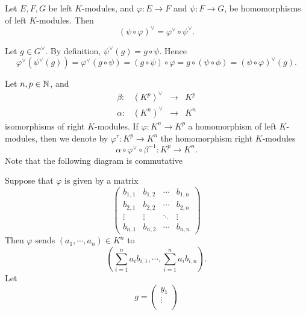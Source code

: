 \begin{propositionenv}
    Let $E,F,G$ be left $K$-modules, and $\varphi : E\rightarrow F$ and $\psi: F\rightarrow G$, be homomorphisms of left $K$-modules. Then 
    $$
    \left(\psi \circ \varphi\right)^\vee = \varphi^\vee \circ \psi^\vee.
    $$
\end{propositionenv}
\begin{proofenv}
    Let $g \in G^\vee$. By definition, $\psi^\vee(g) = g \circ \psi$. Hence
    $$
    \varphi^\vee \left(\psi^\vee (g)\right) = \varphi^\vee \left(g \circ \psi\right) = \left( g\circ \psi \right) \circ \varphi = g\circ \left(\psi \circ\phi\right) = \left(\psi \circ \varphi \right)^\vee (g).
    $$
\end{proofenv}
\begin{exampleenv}
    Let $n,p \in \NN$, and
    $$\begin{array}{rrcl}
        \beta : & \left(K^p\right)^\vee & \rightarrow & K^p\\
        \alpha : & \left(K^n\right)^\vee & \rightarrow & K^n
    \end{array}$$
    isomorphisms of right $K$-modules. If $\varphi : K^n\rightarrow K^p$ a homomorphism of left $K$-modules, then we denote by $\varphi^\tau : K^p \rightarrow K^n$ the homomorphism right $K$-modules 
    $$ \alpha \circ \varphi^\vee \circ \beta^{-1} : K^p \rightarrow K^n.$$
    Note that the following diagram is commutative
    \begin{center}
\end{center}
Suppose that $\varphi$ is given by a matrix
$$
\begin{pmatrix}
    b_{1,1} & b_{1,2} & \cdots & b_{1,n}\\
    b_{2,1} & b_{2,2} & \cdots & b_{2,n}\\
    \vdots  & \vdots  & \ddots & \vdots\\
    b_{n,1} & b_{n,2} & \cdots & b_{n,n}
\end{pmatrix}
$$
Then $\varphi$ sends $\left(a_1,\cdots,a_n\right) \in K^{n}$ to 
$$
\left(\sum_{i=1}^{n} a_i b_{i,1}, \cdots , \sum_{i=1}^{n} a_i b_{i,n}\right).
$$
Let
$$
g = 
\begin{pmatrix}
    y_1\\
    \vdots\\

\end{pmatrix}$$
\end{exampleenv}
